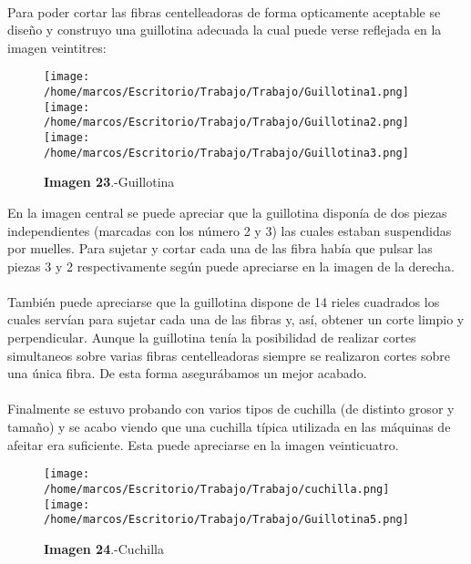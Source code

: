 \paragraph {}
Para poder cortar las fibras centelleadoras de forma opticamente aceptable se diseño y construyo una guillotina adecuada la cual puede verse reflejada en la imagen veintitres:

\begin{figure}[htb]
\centering
{
\texttt{[image: /home/marcos/Escritorio/Trabajo/Trabajo/Guillotina1.png]} 
}
{
\texttt{[image: /home/marcos/Escritorio/Trabajo/Trabajo/Guillotina2.png]} 
}
{
\texttt{[image: /home/marcos/Escritorio/Trabajo/Trabajo/Guillotina3.png]} 
}
\caption{\textbf{Imagen 23}.-Guillotina}
\end{figure} 

En la imagen central se puede apreciar que la guillotina disponía de dos piezas independientes (marcadas con los número 2 y 3) las cuales estaban suspendidas por muelles. Para sujetar y cortar cada una de las fibra había que pulsar las piezas 3 y 2 respectivamente según puede apreciarse en la imagen de la derecha. 

\paragraph {} 
También puede apreciarse que la guillotina dispone de 14 rieles cuadrados los cuales servían para sujetar cada una de las fibras y, así, obtener un corte limpio y perpendicular. Aunque la guillotina tenía la posibilidad de realizar cortes simultaneos sobre varias fibras centelleadoras siempre se realizaron cortes sobre una única fibra. De esta forma asegurábamos un mejor acabado.


\paragraph {}
Finalmente se estuvo probando con varios tipos de cuchilla (de distinto grosor y tamaño) y se acabo viendo que una cuchilla típica utilizada en las máquinas de afeitar era suficiente. Esta puede apreciarse en la imagen veinticuatro.

\begin{figure}[htb]
\centering
{
\texttt{[image: /home/marcos/Escritorio/Trabajo/Trabajo/cuchilla.png]} 
}
{
\texttt{[image: /home/marcos/Escritorio/Trabajo/Trabajo/Guillotina5.png]} 
}
\caption{\textbf{Imagen 24}.-Cuchilla}
\end{figure} 

